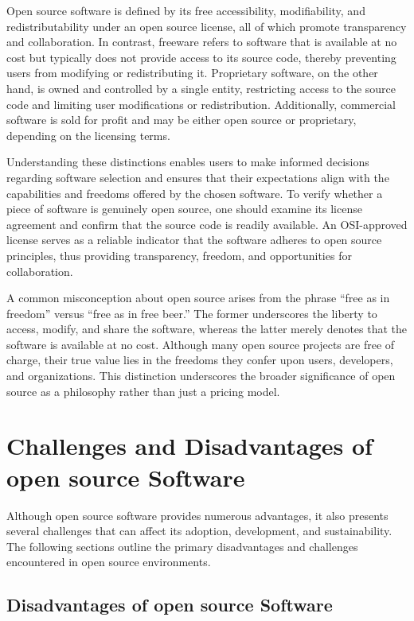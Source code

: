 Open source software is defined by its free accessibility, modifiability, and redistributability under an open source license, 
all of which promote transparency and collaboration. In contrast, freeware refers to software that is available at no cost but typically does not provide access to 
its source code, thereby preventing users from modifying or redistributing it. Proprietary software, 
on the other hand, is owned and controlled by a single entity, restricting access to the source code and limiting user modifications or redistribution. 
Additionally, commercial software is sold for profit and may be either open source or proprietary, depending on the licensing terms.

Understanding these distinctions enables users to make informed decisions regarding software selection and ensures that their expectations align with the capabilities and 
freedoms offered by the chosen software. To verify whether a piece of software is genuinely open source, one should examine its license agreement and confirm that the source 
code is readily available. An OSI-approved license serves as a reliable indicator that the software adheres to open source principles, 
thus providing transparency, freedom, and opportunities for collaboration.

A common misconception about open source arises from the phrase “free as in freedom” versus “free as in free beer.” The former underscores the liberty to access, modify, 
and share the software, whereas the latter merely denotes that the software is available at no cost. Although many open source projects are free of charge, 
their true value lies in the freedoms they confer upon users, developers, and organizations. This distinction underscores the broader significance of open source as a 
philosophy rather than just a pricing model.

\cite{forbes_misconceptions_open_source_2024}

\section{Challenges and Disadvantages of open source Software}

Although open source software provides numerous advantages, it also presents several challenges that can affect its adoption, development, and sustainability. The following sections outline the primary disadvantages and challenges encountered in open source environments.

\subsection{Disadvantages of open source Software}

